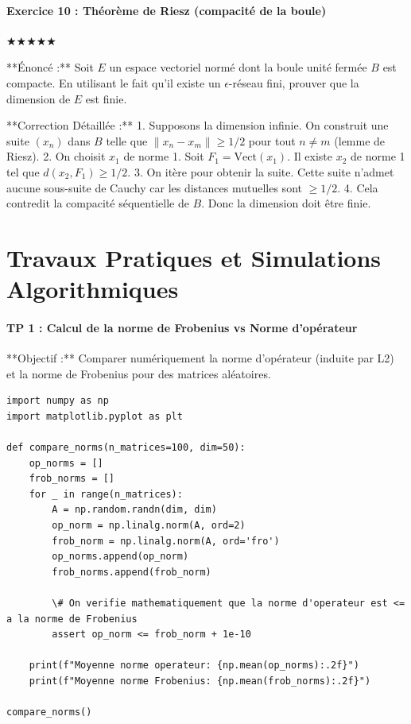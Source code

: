 \documentclass[11pt,a4paper]{article}
\begin{document}
\subsection*{Exercice 10 : Théorème de Riesz (compacité de la boule)}
$\bigstar\bigstar\bigstar\bigstar\bigstar$

**Énoncé :**
Soit $E$ un espace vectoriel normé dont la boule unité fermée $B$ est compacte. En utilisant le fait qu'il existe un $\epsilon$-réseau fini, prouver que la dimension de $E$ est finie.

**Correction Détaillée :**
1. Supposons la dimension infinie. On construit une suite $(x_n)$ dans $B$ telle que $\|x_n - x_m\| \ge 1/2$ pour tout $n \neq m$ (lemme de Riesz).
2. On choisit $x_1$ de norme 1. Soit $F_1 = \text{Vect}(x_1)$. Il existe $x_2$ de norme 1 tel que $d(x_2, F_1) \ge 1/2$.
3. On itère pour obtenir la suite. Cette suite n'admet aucune sous-suite de Cauchy car les distances mutuelles sont $\ge 1/2$.
4. Cela contredit la compacité séquentielle de $B$. Donc la dimension doit être finie.




\newpage
\part{Travaux Pratiques et Simulations Algorithmiques}
\subsection*{TP 1 : Calcul de la norme de Frobenius vs Norme d'opérateur}

**Objectif :**
Comparer numériquement la norme d'opérateur (induite par L2) et la norme de Frobenius pour des matrices aléatoires.

\begin{lstlisting}
import numpy as np
import matplotlib.pyplot as plt

def compare_norms(n_matrices=100, dim=50):
    op_norms = []
    frob_norms = []
    for _ in range(n_matrices):
        A = np.random.randn(dim, dim)
        op_norm = np.linalg.norm(A, ord=2)
        frob_norm = np.linalg.norm(A, ord='fro')
        op_norms.append(op_norm)
        frob_norms.append(frob_norm)

        \# On verifie mathematiquement que la norme d'operateur est <= a la norme de Frobenius
        assert op_norm <= frob_norm + 1e-10

    print(f"Moyenne norme operateur: {np.mean(op_norms):.2f}")
    print(f"Moyenne norme Frobenius: {np.mean(frob_norms):.2f}")

compare_norms()

\end{lstlisting}
\end{document}
